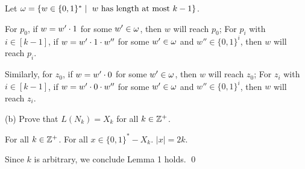 \documentclass[11pt, sakura, night, 1in]{hw}
\begin{document}
Let $\omega=\{w\in\{0,1\}^*\mid \text{ $w$ has length at most $k-1$}\}$.

For $p_0$, if $w=w'\cdot 1$ for some $w'\in\omega$, then $w$ will reach $p_0$; For $p_i$ with $i\in[k-1]$, if $w=w'\cdot 1\cdot w''$ for some $w'\in\omega$ and $w''\in\{0,1\}^{i}$, then $w$ will reach $p_i$.

Similarly, for $z_0$, if $w=w'\cdot 0$ for some $w'\in\omega$, then $w$ will reach $z_0$; For $z_i$ with $i\in[k-1]$, if $w=w'\cdot 0\cdot w''$ for some $w'\in\omega$ and $w''\in\{0,1\}^{i}$, then $w$ will reach $z_i$.



(b) Prove that $L(N_k) = X_k$ for all $k \in \mathbb{Z}^+$.

 For all $k\in\mathbb{Z}^+$. For all $x\in \{0,1\}^*-X_k$. $|x|=2k$.


Since $k$ is arbitrary, we conclude Lemma 1 holds. \qed
\end{document}

